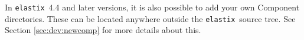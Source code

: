 \documentclass[]{report}
\newcommand{\elastix}{\texttt{elastix}}
\newcommand{\transformix}{\texttt{transformix}}
\begin{document}
In \elastix\ 4.4 and later versions, it is also possible to add your own
Component directories. These can be located anywhere outside the \elastix\
source tree. See Section \ref{sec:dev:newcomp} for more details about this.

%
%
%
%
\end{document}
